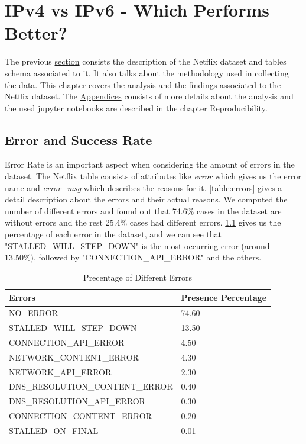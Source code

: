 \hypersetup{linkcolor=blue}
\chapter{IPv4 vs IPv6 - Which Performs Better?}\label{chapter:4}

The previous \hyperref[chapter:Datasets]{section} consists the description of the Netflix dataset and tables schema associated to it. It also talks about the methodology used in collecting the data. This chapter covers the analysis and the findings associated to the Netflix dataset. The \hyperref[chapter:appendix]{Appendices} consists of more details about the analysis and the used jupyter notebooks are described in the chapter \hyperref[chapter:Reproducibility]{Reproducibility}.   

\section{Error and Success Rate}\label{chapter:esrate}
Error Rate is an important aspect when considering the amount of errors in the dataset. The Netflix table consists of attributes like \textit{error} which gives us the error name and \textit{error\_msg} 
which describes the reasons for it. \cref{table:errors} gives a detail description about the errors and their actual reasons. 
We computed the number of different errors and found out that 74.6\% cases in the dataset are without errors and the rest 25.4\% cases had different errors. \cref{table:errpercentage} 
gives us the percentage of each error in the dataset, and we can see that "STALLED\_WILL\_STEP\_DOWN" is the most occurring error (around 13.50\%), followed by "CONNECTION\_API\_ERROR" and the others.  
\begin{table}[!h]
	\centering
	\caption{Precentage of Different Errors}
	\label{table:errpercentage}
	\begin{tabular}{lp{2cm}}
  		\toprule
  		\textbf{Errors} & \textbf{Presence Percentage} \\ 
  		\midrule
  		NO\_ERROR & 74.60 \\ 
  		STALLED\_WILL\_STEP\_DOWN & 13.50 \\
  		CONNECTION\_API\_ERROR & 4.50 \\
  		NETWORK\_CONTENT\_ERROR & 4.30 \\
  		NETWORK\_API\_ERROR & 2.30 \\
  		DNS\_RESOLUTION\_CONTENT\_ERROR & 0.40 \\  
		DNS\_RESOLUTION\_API\_ERROR &  0.30 \\ 
		CONNECTION\_CONTENT\_ERROR & 0.20 \\  
		STALLED\_ON\_FINAL & 0.01 \\
  		\bottomrule
\end{tabular}
\end{table}

